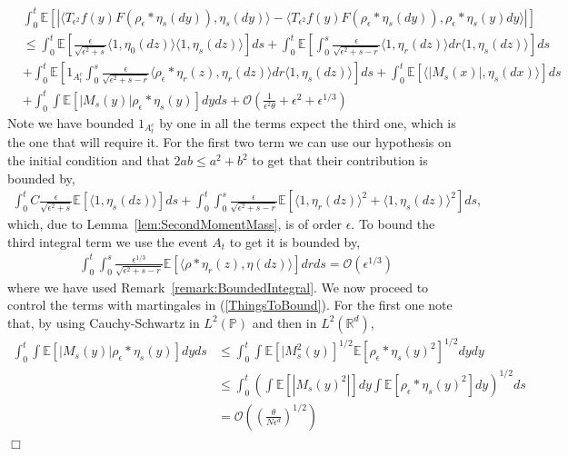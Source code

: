 \documentclass[12pt]{article}
\newenvironment {proof}{{\noindent\bf Proof }}{\hfill $\Box$ \medskip}
\newcommand{\IE}{\mathbb E}
\newcommand{\IR}{\mathbb R}
\begin{document}
\begin{proof}
\begin{align}
&\int_0^t \IE[|\langle T_{\epsilon^2} f(y) F(\rho_\epsilon *\eta_s(dy)), \eta_s(dy) \rangle - \langle T_{\epsilon^2} f(y) F(\rho_\epsilon * \eta_s(dy)), \rho_\epsilon * \eta_s(y) dy \rangle|] \nonumber \\ &\leq   \int_0^t \IE[ \frac{\epsilon}{\sqrt{\epsilon^2 + s}} \langle 1,\eta_0(dz) \rangle \langle 1, \eta_s(dz)\rangle ] ds +  \int_0^t \IE[  \int_0^s \frac{\epsilon}{\sqrt{\epsilon^2 + s - r}} \langle 1, \eta_r (dz) \rangle dr \langle 1, \eta_s(dz) \rangle  ] ds \nonumber\\ & + \int_0^t \IE[   1_{A^c_{t}} \int_0^s \frac{\epsilon}{\sqrt{\epsilon^2 + s - r}} \langle \rho_\epsilon*\eta_r(z), \eta_r(dz) \rangle dr \langle 1, \eta_s(dz) \rangle  ] ds + \int_0^t \IE[\langle |M_s(x)|,\eta_s(dx) \rangle] ds \nonumber \\ &+ \int_0^t \int \IE[|M_s(y)|\rho_\epsilon*\eta_s(y)] dy ds  +\mathcal{O}\left( \frac{1}{\epsilon^2 \theta} + \epsilon^2 + \epsilon^{1/3} \right)  \label{ThingsToBound}
\end{align}
Note we have bounded $1_{A^c_{t}}$ by one in all the terms expect the third one, which is the one that will require it. For the first two term we can use our hypothesis on the initial condition and that $2 ab \leq a^2+b^2$ to get that their contribution is bounded by,
\begin{align*}
\int_0^t C \frac{\epsilon}{\sqrt{\epsilon^2+s}}\IE[\langle 1, \eta_s(dz) \rangle] ds + \int_0^t \int_0^s \frac{\epsilon}{\sqrt{\epsilon^2+s-r}}\IE[\langle 1, \eta_r(dz)\rangle^2 + \langle 1, \eta_s(dz)\rangle^2] ds,
\end{align*}
which, due to Lemma~\ref{lem:SecondMomentMass}, is of order $\epsilon$. To bound the third integral term we use the event $A_{t}$ to get it is bounded by,
\begin{align*}
\int_0^t \int_0^s \frac{\epsilon^{1/3}}{\sqrt{\epsilon^2+s-r}} \IE[ \langle \rho*\eta_r(z), \eta(dz) \rangle] dr ds = \mathcal{O}(\epsilon^{1/3})
\end{align*}
where we have used Remark~\ref{remark:BoundedIntegral}. 
We now proceed to control the terms with martingales in (\ref{ThingsToBound}). For the first one note that, by using Cauchy-Schwartz in $L^2(\mathbb{P})$ and then in $L^2(\IR^d)$,
\begin{align}
\int_0^t \int \IE[|M_s(y)|\rho_\epsilon*\eta_s(y)] dy ds & \leq \int_0^t \int \IE[|M^2_s(y)]^{1/2} \IE[\rho_\epsilon * \eta_s(y)^2]^{1/2} dy dy \nonumber \\ & \leq \int_0^t \left( \int \IE[|M_s(y)^2|] dy \int \IE[\rho_\epsilon * \eta_s(y)^2] dy \right)^{1/2} ds  \nonumber \\ &= \mathcal{O}\left( \left( \frac{\theta}{N \epsilon^d} \right)^{1/2} \right)

\end{align}
\end{proof}
\end{document}
